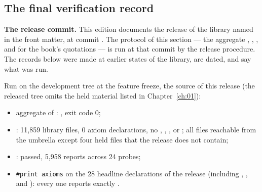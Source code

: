 \subsection{The final verification record}\label{ch15:sec:record}

\textbf{The release commit.} This edition documents the release of the library named in the front matter, at commit
\texttt{\bookcommit}. The protocol of this section --- the aggregate , ,
, and  for the book's quotations --- is run at that commit by the
release procedure. The records below were made at earlier states of the library, are dated, and say what was run.

\begin{status}[title={The release build (3 November 2026)}]
Run on the development tree at the feature freeze, the source of this release (the released tree omits the held
material listed in Chapter~\ref{ch:01}):
\begin{itemize}
\item aggregate  of : , exit code 0;
\item {}: 11{,}859 library files, 0 axiom declarations, no , ,
  ,  or ; all files reachable from the umbrella except four held
  files that the release does not contain;
\item {}: passed, 5{,}958 reports across 24 probes;
\item \texttt{\#print axioms} on the 28 headline declarations of the release (including
  , ,  and
  ): every one reports exactly
  .
\end{itemize}
\end{status}


